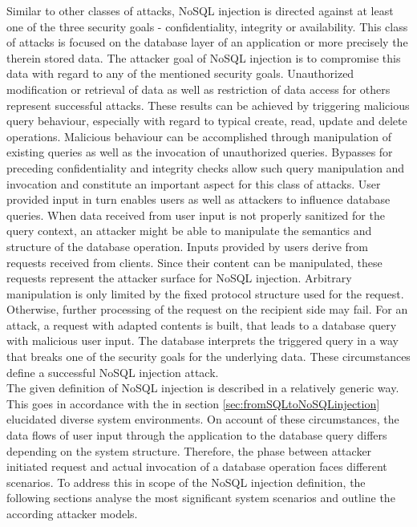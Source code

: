Similar to other classes of attacks, NoSQL injection is directed against at least one of the three security goals - confidentiality, integrity or availability. This class of attacks is focused on the database layer of an application or more precisely the therein stored data. The attacker goal of NoSQL injection is to compromise this data with regard to any of the mentioned security goals. Unauthorized modification or retrieval of data as well as restriction of data access for others represent successful attacks. These results can be achieved by triggering malicious query behaviour, especially with regard to typical create, read, update and delete operations. Malicious behaviour can be accomplished through manipulation of existing queries as well as the invocation of unauthorized queries. Bypasses for preceding confidentiality and integrity checks allow such query manipulation and invocation and constitute an important aspect for this class of attacks. User provided input in turn enables users as well as attackers to influence database queries. When data received from user input is not properly sanitized for the query context, an attacker might be able to manipulate the semantics and structure of the database operation. Inputs provided by users derive from requests received from clients. Since their content can be manipulated, these requests represent the attacker surface for NoSQL injection. Arbitrary manipulation is only limited by the fixed protocol structure used for the request. Otherwise, further processing of the request on the recipient side may fail. For an attack, a request with adapted contents is built, that leads to a database query with malicious user input. The database interprets the triggered query in a way that breaks one of the security goals for the underlying data. These circumstances define a successful NoSQL injection attack.\\

The given definition of NoSQL injection is described in a relatively generic way. This goes in accordance with the in section \ref{sec:fromSQLtoNoSQLinjection} elucidated diverse system environments. On account of these circumstances, the data flows of user input through the application to the database query differs depending on the system structure. Therefore, the phase between attacker initiated request and actual invocation of a database operation faces different scenarios. To address this in scope of the NoSQL injection definition, the following sections analyse the most significant system scenarios and outline the according attacker models.

